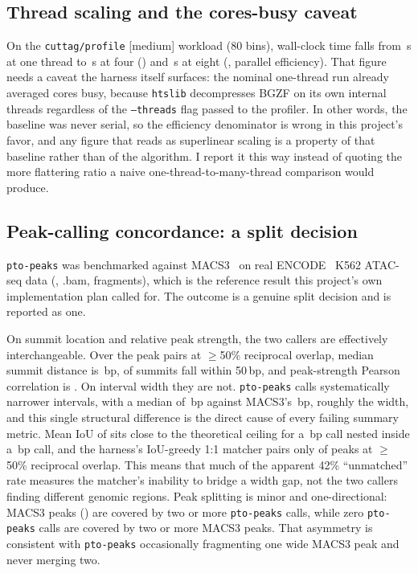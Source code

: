 \documentclass[10pt,twocolumn]{article}
\begin{document}
\subsection{Thread scaling and the cores-busy caveat}

On the \texttt{cuttag/profile} [medium] workload (80 bins), wall-clock time
falls from \ThreadOneWall{}\,s at one thread to \ThreadFourWall{}\,s at four
(\ThreadFourSpeedup{}) and \ThreadEightWall{}\,s at eight
(\ThreadEightSpeedup{}, \ThreadEightEfficiency{} parallel efficiency). That
figure needs a caveat the harness itself surfaces: the nominal one-thread run
already averaged \ThreadOneCoresBusy{} cores busy, because \texttt{htslib}
decompresses BGZF on its own internal threads regardless of the
\texttt{--threads} flag passed to the profiler. In other words, the baseline
was never serial, so the efficiency denominator is wrong in this project's
favor, and any figure that reads as superlinear scaling is a property of that
baseline rather than of the algorithm. I report it this way instead of
quoting the more flattering ratio a naive one-thread-to-many-thread
comparison would produce.

\subsection{Peak-calling concordance: a split decision}
\label{sec:peak-concordance}



\texttt{pto-peaks} was benchmarked against MACS3~\citep{zhang2008macs} on
real ENCODE~\citep{encode2012} K562 ATAC-seq data (\EncodeAccession{},
\EncodeBamAccession{}.bam, \EncodeFragments{} fragments), which is the
reference result this project's own implementation plan called for. The
outcome is a genuine split decision and is reported as one.

On summit location and relative peak strength, the two callers are
effectively interchangeable. Over the \NumMatchedPairsIoU{} peak pairs at
$\geq$50\% reciprocal overlap, median summit distance is
\MatchedSummitDist{}\,bp, \MatchedSummitWithinFifty{} of summits fall within
50\,bp, and peak-strength Pearson correlation is \MatchedPearsonR{}. On
interval width they are not. \texttt{pto-peaks} calls systematically narrower
intervals, with a median of \PtoMedianWidth{}\,bp against MACS3's
\MacsMedianWidth{}\,bp, roughly \WidthRatio{} the width, and this single
structural difference is the direct cause of every failing summary metric.
Mean IoU of \MeanIoU{} sits close to the theoretical ceiling for a
\PtoMedianWidth{}\,bp call nested inside a \MacsMedianWidth{}\,bp call, and
the harness's IoU-greedy 1:1 matcher pairs only \ReciprocalOverlapFrac{} of
peaks at $\geq$50\% reciprocal overlap. This means that much of the apparent
42\% ``unmatched'' rate measures the matcher's inability to bridge a width
gap, not the two callers finding different genomic regions. Peak splitting is
minor and one-directional: \SplitMacsPeaks{} MACS3 peaks
(\SplitMacsPct{}) are covered by two or more \texttt{pto-peaks} calls, while
zero \texttt{pto-peaks} calls are covered by two or more MACS3 peaks. That
asymmetry is consistent with \texttt{pto-peaks} occasionally fragmenting one
wide MACS3 peak and never merging two.
\end{document}

